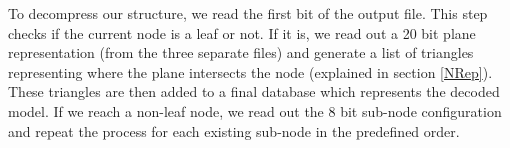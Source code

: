 To decompress our structure, we read the first bit of the output file. This step checks if the current node is a leaf or not. If it is, we read out a 20 bit plane representation (from the three separate files) and generate a list of triangles representing where the plane intersects the node (explained in section \ref{NRep}). These triangles are then added to a final database which represents the decoded model. If we reach a non-leaf node, we read out the 8 bit sub-node configuration and repeat the process for each existing sub-node in the predefined order. \\  
